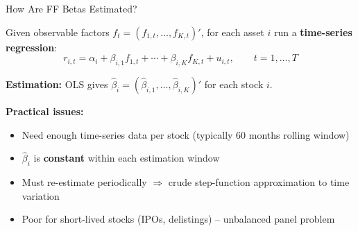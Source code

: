 \documentclass[aspectratio=169]{beamer}
\begin{document}
%
%
\begin{frame}{How Are FF Betas Estimated?}

Given observable factors $f_t = (f_{1,t}, \ldots, f_{K,t})'$, for each asset $i$ run a \textbf{time-series regression}:
\[
r_{i,t} = \alpha_i + \beta_{i,1} f_{1,t} + \cdots + \beta_{i,K} f_{K,t} + u_{i,t}, \qquad t = 1, \ldots, T
\]

\vspace{0.3em}
\textbf{Estimation:} OLS gives $\hat{\beta}_i = (\hat{\beta}_{i,1}, \ldots, \hat{\beta}_{i,K})'$ for each stock $i$.

\vspace{0.7em}
\textbf{Practical issues:}
\begin{itemize}
    \item Need enough time-series data per stock (typically 60 months rolling window)
    \item $\hat{\beta}_i$ is \textbf{constant} within each estimation window
    \item Must re-estimate periodically $\Rightarrow$ crude step-function approximation to time variation
    \item Poor for short-lived stocks (IPOs, delistings) -- unbalanced panel problem
\end{itemize}

\vspace{0.5em}
\end{frame}
%
%
\end{document}
